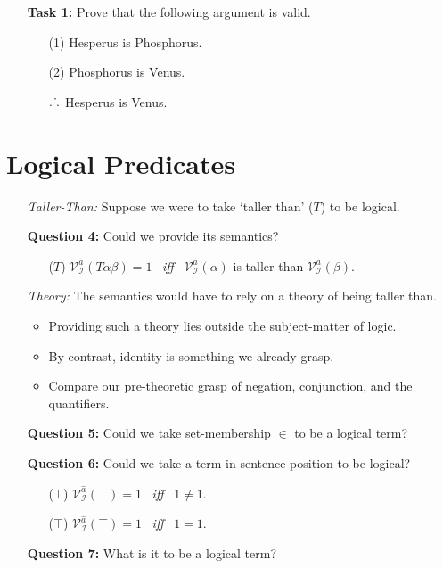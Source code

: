 \documentclass[a4paper, 11pt]{article} %
\def\therefore{\ensuremath{\ldotp\dot\,\ldotp}}
\newcommand{\I}{\mathcal{I}}
\newcommand{\VV}[2]{\mathcal{V}_{#1}^{#2}} %
\begin{document}
\begin{enumerate}
  \item[\bf Task 1:] Prove that the following argument is valid.
    \begin{itemize}
      \item[(1)] Hesperus is Phosphorus.
      \item[(2)] Phosphorus is Venus.
      \item[$\therefore$] Hesperus is Venus.
    \end{itemize}
\end{enumerate}





\section*{Logical Predicates}

\begin{enumerate}
  \item[\it Taller-Than:] Suppose we were to take `taller than' ($T$) to be logical.
  \item[\bf Question 4:] Could we provide its semantics?
    \begin{itemize}
      \item[($T$)] $\VV{\I}{\hat{a}}(T\alpha\beta)=1$ ~\textit{iff}~ $\VV{\I}{\hat{a}}(\alpha)$ is taller than $\VV{\I}{\hat{a}}(\beta)$.
    \end{itemize}
  \item[\it Theory:] The semantics would have to rely on a theory of being taller than.
    \begin{itemize}
      \item Providing such a theory lies outside the subject-matter of logic.
      \item By contrast, identity is something we already grasp.
      \item Compare our pre-theoretic grasp of negation, conjunction, and the quantifiers.
    \end{itemize}
  \item[\bf Question 5:] Could we take set-membership $\in$ to be a logical term? 
  \item[\bf Question 6:] Could we take a term in sentence position to be logical?
    \begin{itemize}
      \item[($\bot$)] $\VV{\I}{\hat{a}}(\bot)=1$ ~\textit{iff}~ $1\neq 1$.
      \item[($\top$)] $\VV{\I}{\hat{a}}(\top)=1$ ~\textit{iff}~ $1=1$.
    \end{itemize}
  \item[\bf Question 7:] What is it to be a logical term?
\end{enumerate}
\end{document}
